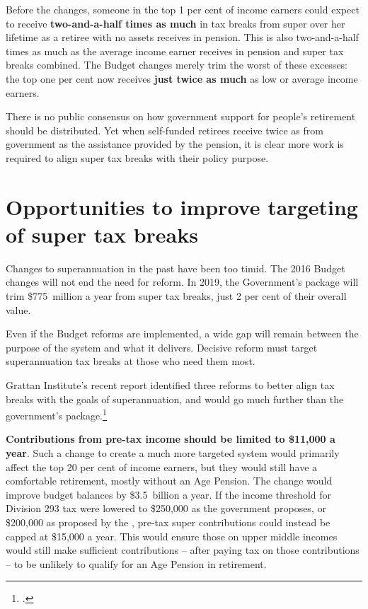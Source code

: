 \documentclass[continuous]{grattan}\usepackage[]{graphicx}\usepackage[]{color}
\begin{document}
Before the changes, someone in the top 1 per cent of income earners could expect to receive \textbf{two-and-a-half times as much} in tax breaks from super over her lifetime as a retiree with no assets receives in pension. 
This is also two-and-a-half times as much as the average income earner receives in pension and super tax breaks combined. 
The Budget changes merely trim the worst of these excesses: the top one per cent now receives \textbf{just twice as much} as low or average income earners.

There is no public consensus on how government support for people's retirement should be distributed. 
Yet when self-funded retirees receive twice as from government as the assistance provided by the pension, it is clear more work is required to align super tax breaks with their policy purpose.

\section{Opportunities to improve targeting of super tax breaks }\label{sec:opportunities-to-improve-targeting-of-super-tax-breaks}

Changes to superannuation in the past have been too timid. The 2016 Budget changes will not end the need for reform. In 2019, the Government's package will trim \$775~million a year from super tax breaks, just 2 per cent of their overall value.

Even if the Budget reforms are implemented, a wide gap will remain between the purpose of the system and what it delivers. 
Decisive reform must target superannuation tax breaks at those who need them most.

Grattan Institute's recent  report identified three reforms to better align tax breaks with the goals of superannuation, and would go much further than the government’s package.\footcite{DaleyCoatesWoodEtAl2015Super}

\textbf{Contributions from pre-tax income should be limited to \$11,000 a year}. 
Such a change to create a much more targeted system would primarily affect the top 20 per cent of income earners, but they would still have a comfortable retirement, mostly without an Age Pension. 
The change would improve budget balances by \$3.5~billion a year. 
If the income threshold for Division 293 tax were lowered to \$250,000 as the government proposes, or \$200,000 as proposed by the \ALP{}, pre-tax super contributions could instead be capped at \$15,000 a year.
This would ensure those on upper middle incomes would still make sufficient contributions -- after paying tax on those contributions -- to be unlikely to qualify for an Age Pension in retirement. 
\end{document}
